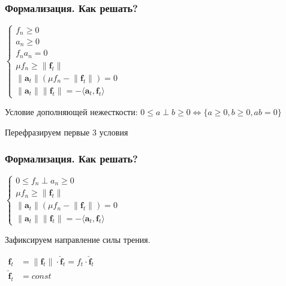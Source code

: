\documentclass{beamer}
\newcommand{\norm}[1]{\lVert#1\rVert}
\begin{document}
\begin{frame}[t]
\frametitle{Формализация. Как решать?}
    \small
    $
    \begin{cases}
        f_n \ge 0 \\
        a_n \ge 0 \\
        f_n a_n = 0 \\ 
        \mu f_n \ge \norm{\pmb{f}_t} \\
        \norm{\pmb{a}_t} (\mu f_n - \norm{\pmb{f}_t}) = 0 \\
        \norm{\pmb{a}_t} \norm{\pmb{f}_t} = - \langle \pmb{a}_t, \pmb{f}_t \rangle
    \end{cases}
    $

    \bigskip
    Условие дополняющей нежесткости:
    $0 \le a \perp b \ge 0  \iff  \{ a \ge 0, b \ge 0, ab = 0 \}$

    \bigskip
    Перефразируем первые 3 условия
\end{frame}

\begin{frame}[t]
\frametitle{Формализация. Как решать?}
    \small \bigskip \bigskip \medskip
    $
    \begin{cases}
        0 \le f_n \perp a_n \ge 0 \\
        \mu f_n \ge \norm{\pmb{f}_t} \\
        \norm{\pmb{a}_t} (\mu f_n - \norm{\pmb{f}_t}) = 0 \\
        \norm{\pmb{a}_t} \norm{\pmb{f}_t} = -\langle \pmb{a}_t, \pmb{f}_t \rangle
    \end{cases}
    $

    \bigskip
    Зафиксируем направление силы трения.
    
    \bigskip
    $
    \begin{aligned}
    \pmb{f}_t &= \norm{\pmb{f}_t} \cdot \pmb{\hat{f}}_t = f_t \cdot \pmb{\hat{f}}_t \\
    \pmb{\hat{f}}_t &= const
    \end{aligned}
    $
\end{frame}
\end{document}

